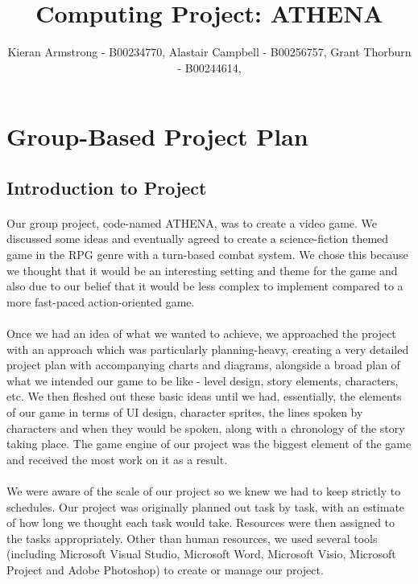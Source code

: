 \documentclass{article}
\title{Computing Project: ATHENA}
\author{Kieran Armstrong - B00234770, Alastair Campbell - B00256757, Grant Thorburn - B00244614,}
\begin{document}
\begin{titlepage}
\maketitle
\end{titlepage}

\tableofcontents

\pagebreak{}

\section {Group-Based Project Plan}
\subsection{Introduction to Project}
\paragraph{}
Our group project, code-named ATHENA, was to create a video game. We discussed some ideas and eventually agreed to create a science-fiction themed game in the RPG genre with a turn-based combat system. We chose this because we thought that it would be an interesting setting and theme for the game and also due to our belief that it would be less complex to implement compared to a more fast-paced action-oriented game. 
\paragraph{}
Once we had an idea of what we wanted to achieve, we approached the project with an approach which was particularly planning-heavy, creating a very detailed project plan with accompanying charts and diagrams, alongside a broad plan of what we intended our game to be like - level design, story elements, characters, etc. We then fleshed out these basic ideas until we had, essentially, the elements of our game in terms of UI design, character sprites, the lines spoken by characters and when they would be spoken, along with a chronology of the story taking place. The game engine of our project was the biggest element of the game and received the most work on it as a result. 
\paragraph{}
We were aware of the scale of our project so we knew we had to keep strictly to schedules. Our project was originally planned out task by task, with an estimate of how long we thought each task would take. Resources were then assigned to the tasks appropriately. Other than human resources, we used several tools (including Microsoft Visual Studio, Microsoft Word, Microsoft Visio, Microsoft Project and Adobe Photoshop) to create or manage our project.
\end{document}
